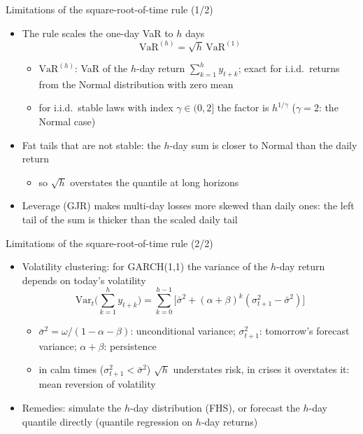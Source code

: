 \begin{frame}{Limitations of the square-root-of-time rule (1/2)}
\itemsize{\small}
\begin{itemize}
    \item The rule scales the one-day VaR to $h$ days
    \[ \mathrm{VaR}^{(h)} = \sqrt h\,\mathrm{VaR}^{(1)} \]
    \begin{itemize}
        \item $\mathrm{VaR}^{(h)}$: VaR of the $h$-day return $\sum_{k=1}^h y_{t+k}$; exact for i.i.d.\ returns from the Normal distribution with zero mean
        \item for i.i.d.\ stable laws with index $\gamma \in (0, 2]$ the factor is $h^{1/\gamma}$ ($\gamma = 2$: the Normal case)
    \end{itemize}
    \item Fat tails that are not stable: the $h$-day sum is closer to Normal than the daily return
    \begin{itemize}
        \item so $\sqrt h$ overstates the quantile at long horizons 
    \end{itemize}
    \item Leverage (GJR) makes multi-day losses more skewed than daily ones: the left tail of the sum is thicker than the scaled daily tail
\end{itemize}
\end{frame}

\begin{frame}{Limitations of the square-root-of-time rule (2/2)}
\itemsize{\small}
\begin{itemize}
    \item Volatility clustering: for GARCH(1,1) the variance of the $h$-day return depends on today's volatility
    \[ \mathrm{Var}_t\Big(\sum_{k=1}^h y_{t+k}\Big) = \sum_{k=0}^{h-1}\big[\bar\sigma^2 + (\alpha + \beta)^k(\sigma_{t+1}^2 - \bar\sigma^2)\big] \]
    \begin{itemize}
        \item $\bar\sigma^2 = \omega/(1 - \alpha - \beta)$: unconditional variance; $\sigma^2_{t+1}$: tomorrow's forecast variance; $\alpha + \beta$: persistence
        \item in calm times ($\sigma^2_{t+1} < \bar\sigma^2$) $\sqrt h$ understates risk, in crises it overstates it: mean reversion of volatility
    \end{itemize}
    \item Remedies: simulate the $h$-day distribution (FHS), or forecast the $h$-day quantile directly (quantile regression on $h$-day returns)
\end{itemize}
\end{frame}

